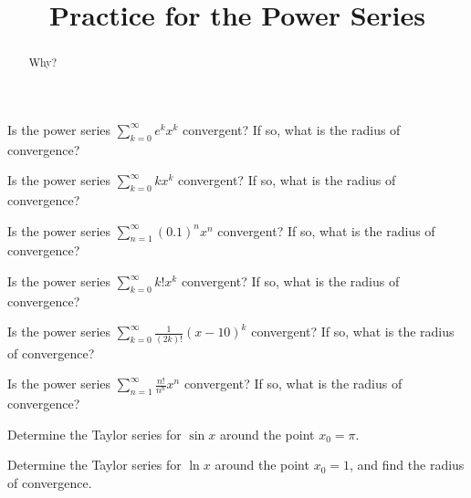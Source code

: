 \documentclass{ximera}
\title{Practice for the Power Series}
\begin{document}
\begin{abstract}
Why?
\end{abstract}
\maketitle



\begin{exercise}
    Is the power series $\displaystyle \sum_{k=0}^\infty e^k x^k$ convergent? If so, what is the radius of convergence?
\end{exercise}

\begin{exercise}
    Is the power series $\displaystyle \sum_{k=0}^\infty k x^k$ convergent? If so, what is the radius of convergence?
\end{exercise}

\begin{exercise}
    Is the power series $\displaystyle \sum_{n=1}^\infty {(0.1)}^n x^n$ convergent? If so, what is the radius of convergence?
\end{exercise}


\begin{exercise}
    Is the power series $\displaystyle \sum_{k=0}^\infty k! x^k$ convergent? If so, what is the radius of convergence?
\end{exercise}

\begin{exercise}
    Is the power series $\displaystyle \sum_{k=0}^\infty \frac{1}{(2k)!} {(x-10)}^k$ convergent?  If so, what is the radius of convergence?
\end{exercise}

\begin{exercise}%
    Is the power series $\displaystyle \sum_{n=1}^\infty \frac{n!}{n^n} x^n$ convergent? If so, what is the radius of convergence?
\end{exercise}

\begin{exercise}
    Determine the Taylor series for $\sin x$ around the point $x_0 = \pi$.
\end{exercise}

\begin{exercise}
    Determine the Taylor series for $\ln x$ around the point $x_0 = 1$, and find the radius of convergence.
\end{exercise}
\end{document}
